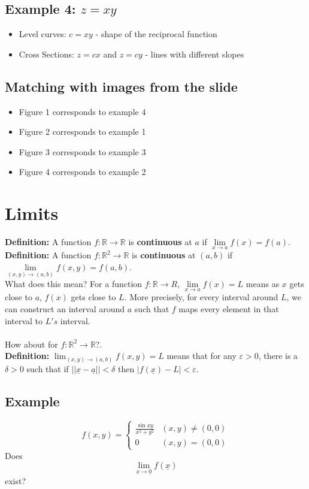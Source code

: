 \documentclass[12pt]{article}
\newcommand{\R}{\mathbb{R}}
\begin{document}
\subsection{Example 4: $z=xy$}
\begin{itemize}
    \item Level curves: $c=xy$ - shape of the reciprocal function 
    \item Cross Sections: $z=cx$ and $z=cy$ - lines with different slopes
\end{itemize}

\subsection{Matching with images from the slide}
\begin{itemize}
    \item Figure 1 corresponds to example 4
    \item Figure 2 corresponds to example 1
    \item Figure 3 corresponds to example 3
    \item Figure 4 corresponds to example 2
\end{itemize}

\section{Limits}
\textbf{Definition:} A function $f:\R\to\R$ is \textbf{continuous} at $a$ if $\lim\limits_{x\to a} f(x)=f(a)$.\\
\textbf{Definition:} A function $f:\R^2\to\R$ is \textbf{continuous} at $(a,b)$ if $\lim\limits_{(x,y)\to (a,b)}f(x,y)=f(a,b)$.\\
What does this mean? For a function $f:\R\to R$, $\lim\limits_{x\to a}f(x)=L$ means as $x$ gets close to $a$, $f(x)$ gets close to $L$. More precisely, for every interval around $L$, we can construct an interval around $a$ such that $f$ maps every element in that interval to $L's$ interval.\\\\
How about for $f:\R^2\to\R$?. \\
\textbf{Definition:} $\lim_{(x,y)\to (a,b)}f(x,y)=L$ means that for any $\varepsilon>0$, there is a $\delta>0$ such that if $||\underline x-\underline a||<\delta$ then $|f(\underline x)-L|<\varepsilon$.

\subsection{Example}
\[f(x,y)=\begin{cases}
    \frac{\sin xy}{x^2+y^2} &(x,y)\neq (0,0)\\
    0 &(x,y)=(0,0)
\end{cases}
    \]
Does \[\lim_{\underline x\to \underline 0}f(\underline x)\]
exist?
\end{document}
